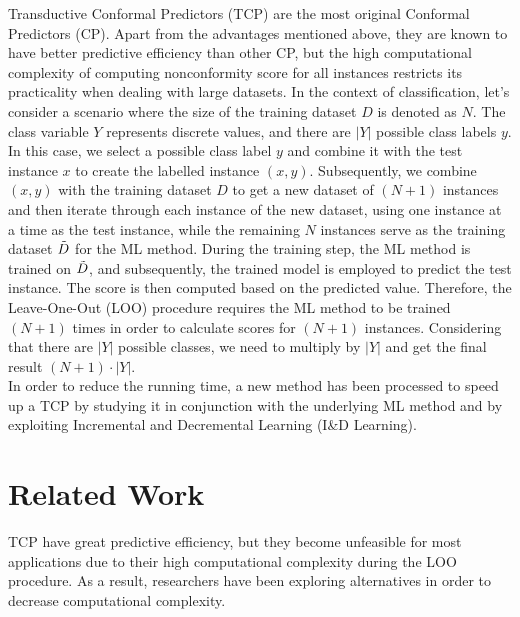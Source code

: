 \documentclass[10pt]{reportMaster}
\begin{document}
\noindent Transductive Conformal Predictors (TCP) are the most original Conformal Predictors (CP). Apart from the advantages mentioned above, they are known to have better predictive efficiency than other CP, but the high computational complexity of computing nonconformity score for all instances restricts its practicality when dealing with large datasets. In the context of classification, let's consider a scenario where the size of the training dataset $D$ is denoted as $N$. The class variable $Y$ represents discrete values, and there are $|Y|$ possible class labels $y$. In this case, we select a possible class label $y$ and combine it with the test instance $x$ to create the labelled instance $(x, y)$. Subsequently, we combine $(x,y)$ with the training dataset $D$ to get a new dataset of $(N+1)$ instances and then iterate through each instance of the new dataset, using one instance at a time as the test instance, while the remaining $N$ instances serve as the training dataset $\Tilde{D}$ for the ML method. During the training step, the ML method is trained on $\Tilde{D}$, and subsequently, the trained model is employed to predict the test instance. The score is then computed based on the predicted value. Therefore, the Leave-One-Out (LOO) procedure requires the ML method to be trained $(N+1)$ times in order to calculate scores for $(N+1)$ instances. Considering that there are $|Y|$ possible classes, we need to multiply by $|Y|$ and get the final result $(N + 1) \cdot |Y|$.\\

\noindent In order to reduce the running time, a new method has been processed to speed up a TCP by studying it in conjunction with the underlying ML method and by exploiting Incremental and Decremental Learning (I\&D Learning). 

\section{Related Work}
TCP have great predictive efficiency, but they become unfeasible for most applications due to their high computational complexity during the LOO procedure. As a result, researchers have been exploring alternatives in order to decrease computational complexity. \\
\end{document}
